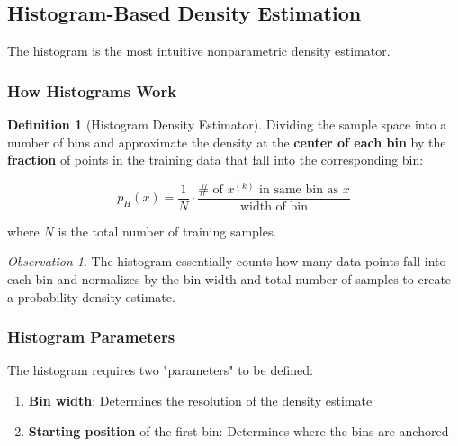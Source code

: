 \documentclass[11pt,a4paper]{article}
\theoremstyle{definition}
\newtheorem{definition}{Definition}[section]
\theoremstyle{plain}
\theoremstyle{remark}
\newtheorem*{observation}{Observation}
\begin{document}
\subsection{Histogram-Based Density Estimation}

The histogram is the most intuitive nonparametric density estimator.

\subsubsection{How Histograms Work}

\begin{definition}[Histogram Density Estimator]
Dividing the sample space into a number of bins and approximate the density at the \textbf{center of each bin} by the \textbf{fraction} of points in the training data that fall into the corresponding bin:

\[
p_H(x) = \frac{1}{N} \cdot \frac{\# \text{ of } x^{(k)} \text{ in same bin as } x}{\text{width of bin}}
\]

where $N$ is the total number of training samples.
\end{definition}

\begin{observation}
The histogram essentially counts how many data points fall into each bin and normalizes by the bin width and total number of samples to create a probability density estimate.
\end{observation}

\subsubsection{Histogram Parameters}

The histogram requires two "parameters" to be defined:

\begin{enumerate}
    \item \textbf{Bin width}: Determines the resolution of the density estimate
    \item \textbf{Starting position} of the first bin: Determines where the bins are anchored
\end{enumerate}

\begin{center}
\end{center}
\end{document}
